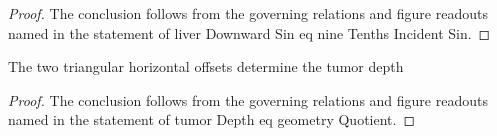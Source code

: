 \begin{proof}
  The conclusion follows from the governing relations and figure readouts named in the statement of liver Downward Sin eq nine Tenths Incident Sin.
\end{proof}
\begin{theorem}
  \label{thm:physics:phyx-mini-0004:phyxminiproblems-phyxmini0004-tumordepth-eq-geometryquotient}
  The two triangular horizontal offsets determine the tumor depth
\end{theorem}
\begin{proof}
  The conclusion follows from the governing relations and figure readouts named in the statement of tumor Depth eq geometry Quotient.
\end{proof}
